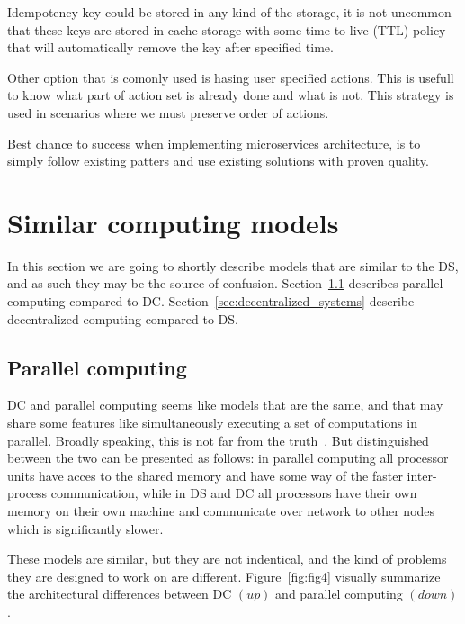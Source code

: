 Idempotency key could be stored in any kind of the storage, it is not uncommon that these keys are stored in cache storage with some time to live (TTL) policy that will automatically remove the key after specified time.

Other option that is comonly used is hasing user specified actions. This is usefull to know what part of action set is already done and what is not. This strategy is used in scenarios where we must preserve order of actions.

Best chance to success when implementing microservices architecture, is to simply follow existing patters and use existing solutions with proven quality.
%
%
\section{Similar computing models}\label{sec:similar_models}
%
In this section we are going to shortly describe models that are similar to the DS, and as such they may be the source of confusion.  Section~\ref{sec:parallel_computing} describes parallel computing compared to DC. Section~\ref{sec:decentralized_systems} describe decentralized computing compared to DS.
%
%
\subsection{Parallel computing}\label{sec:parallel_computing}
%
DC and parallel computing seems like models that are the same, and that may share some features like simultaneously executing a set of computations in parallel. Broadly speaking, this is not far from the truth~\cite{Vera16}. But distinguished between the two can be presented as follows: in parallel computing all processor units have acces to the shared memory and have some way of the faster inter-process communication, while in DS and DC all processors have their own memory on their own machine and communicate over network to other nodes which is significantly slower. 

These models are similar, but they are not indentical, and the kind of problems they are designed to work on are different. Figure~\ref{fig:fig4} visually summarize the architectural  differences between DC $(up)$ and parallel computing $(down)$.

